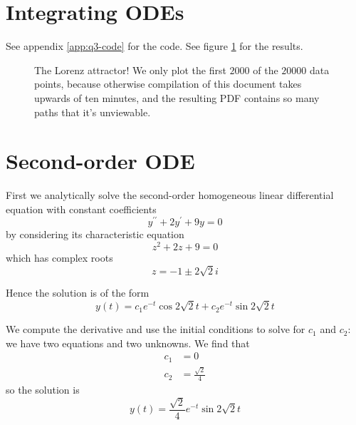 \documentclass[11pt,letterpaper]{article}
\begin{document}
\section{Integrating ODEs}

See appendix \ref{app:q3-code} for the code.
See figure \ref{fig:q3} for the results.

\begin{figure}
  \centering
  \caption{%
    The Lorenz attractor! We only plot the first $2000$ of the $20000$ data
    points, because otherwise compilation of this document takes upwards of ten
    minutes, and the resulting PDF contains so many paths that it's unviewable.
  }
  \label{fig:q3}
\end{figure}

\section{Second-order ODE}

First we analytically solve the second-order homogeneous linear differential
equation with constant coefficients
%
\begin{equation*}
  y^{\prime\prime} + 2 y^\prime + 9 y = 0
\end{equation*}
%
by considering its characteristic equation
%
\begin{equation*}
  z^2 + 2z + 9 = 0
\end{equation*}
%
which has complex roots
%
\begin{equation*}
  z = -1 \pm 2 \sqrt 2 i
\end{equation*}

Hence the solution is of the form
%
\begin{equation*}
  y(t) = c_1 e^{-t} \cos{2\sqrt{2} t} + c_2 e^{-t} \sin{2\sqrt{2} t}
\end{equation*}

We compute the derivative and use the initial conditions to solve for $c_1$ and
$c_2$: we have two equations and two unknowns.
We find that
%
\begin{align*}
  c_1 &= 0 \\
  c_2 &= \frac{\sqrt{2}}{4}
\end{align*}
%
so the solution is
%
\begin{equation*}
  y(t) = \frac{\sqrt{2}}{4} e^{-t} \sin{2 \sqrt 2 t}
\end{equation*}
\end{document}
